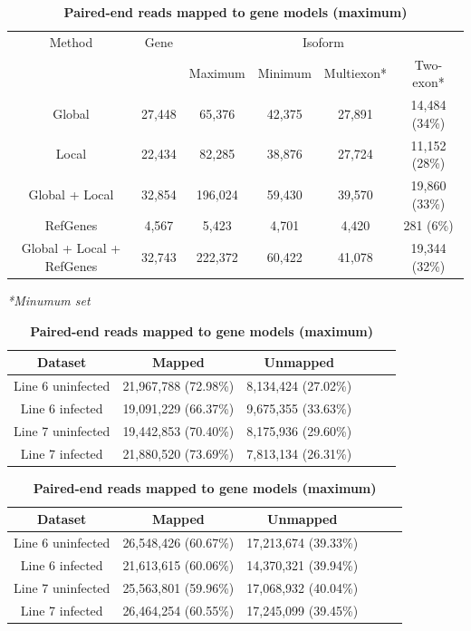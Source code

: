 \documentclass[10pt]{article}
\begin{document}
\begin{table}[!ht]
\caption{
\bf{Number of putative genes and isoforms}}
\begin{tabular}{cccccc}
\hline
Method& Gene & \multicolumn{4}{c}{Isoform} \\ 
& & Maximum & Minimum & Multiexon* & Two-exon* \\
\hline
Global & 27,448 & 65,376 & 42,375 & 27,891 & 14,484 (34\%) \\
Local & 22,434 & 82,285 & 38,876 & 27,724 & 11,152 (28\%) \\
Global + Local & 32,854 & 196,024 & 59,430 & 39,570 & 19,860 (33\%) \\
RefGenes & 4,567 & 5,423 & 4,701 & 4,420 & 281 (6\%) \\
Global + Local + RefGenes & 32,743 & 222,372 & 60,422 & 41,078 & 19,344 (32\%) \\
\hline
\end{tabular}
\begin{flushleft}\footnotesize \textit{*Minumum set}
\end{flushleft}
\label{tab:label}

\caption{
\bf{Single-end reads mapped to gene models (maximum)}}
\begin{tabular}{cccccc}
\hline
Dataset & Mapped & Unmapped \\
\hline
Line 6 uninfected & 21,967,788 (72.98\%) & 8,134,424 (27.02\%) \\
Line 6 infected & 19,091,229 (66.37\%) & 9,675,355 (33.63\%) \\
Line 7 uninfected & 19,442,853 (70.40\%) & 8,175,936 (29.60\%) \\
Line 7 infected & 21,880,520 (73.69\%) & 7,813,134 (26.31\%) \\
\hline
\end{tabular}

\caption{
\bf{Paired-end reads mapped to gene models (maximum)}}
\begin{tabular}{cccccc}
\hline
Dataset & Mapped & Unmapped \\
\hline
Line 6 uninfected & 26,548,426 (60.67\%) & 17,213,674 (39.33\%) \\
Line 6 infected & 21,613,615 (60.06\%) & 14,370,321 (39.94\%) \\
Line 7 uninfected & 25,563,801 (59.96\%) & 17,068,932 (40.04\%) \\
Line 7 infected & 26,464,254 (60.55\%) & 17,245,099 (39.45\%) \\
\hline
\end{tabular}

\end{table}
\end{document}
